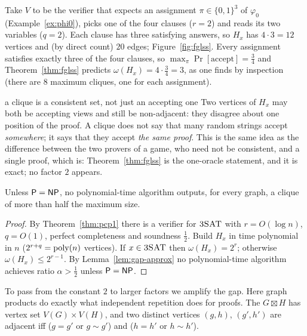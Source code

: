\begin{example}\label{ex:fglss}
Take $V$ to be the verifier that expects an assignment $\pi\in\{0,1\}^3$ of $\varphi_0$ (Example~\ref{ex:phi0}), picks one of the four clauses ($r=2$) and reads its two variables ($q=2$).
Each clause has three satisfying answers, so $H_x$ has $4\cdot3=12$ vertices and (by direct count) $20$ edges; Figure~\ref{fig:fglss}.  Every assignment satisfies exactly three of
the four clauses, so $\max_\pi\Pr[\text{accept}]=\tfrac34$ and Theorem~\ref{thm:fglss} predicts $\omega(H_x)=4\cdot\tfrac34=3$, as one finds by inspection (there are $8$ maximum cliques, one for each
assignment).
\end{example}

\begin{pitfall}[unbreakable]{a clique is a consistent set, not just an accepting one}
Two vertices of $H_x$ may both be accepting views and still be non-adjacent: they disagree about one position of the proof.  A clique does not say that many random strings accept
\emph{somewhere}; it says that they accept \emph{the same proof}.  This is the same idea as the difference between the two provers of a game, who need not be consistent, and a single proof, which is:
Theorem~\ref{thm:fglss} is the one-oracle statement, and it is exact; no factor $2$ appears.
\end{pitfall}

\begin{corollary}\label{cor:clique-const}
Unless $\mathsf{P}=\mathsf{NP}$, no polynomial-time algorithm outputs, for every graph, a clique of more than half the maximum size.
\end{corollary}
\begin{proof}
By Theorem~\ref{thm:pcp1} there is a verifier for $\textsc{3SAT}$ with $r=O(\log n)$, $q=O(1)$, perfect completeness and soundness $\tfrac12$.  Build $H_x$ in time polynomial in $n$ ($2^{r+q}=\operatorname{poly}(n)$ vertices).
If $x\in\textsc{3SAT}$ then $\omega(H_x)=2^r$; otherwise $\omega(H_x)\le2^{r-1}$.  By Lemma~\ref{lem:gap-approx} no polynomial-time algorithm achieves ratio $\alpha>\tfrac12$ unless $\mathsf{P}=\mathsf{NP}$.
\end{proof}

To pass from the constant $2$ to larger factors we amplify the gap.  Here graph products do exactly what independent repetition does for proofs.  The  $G\boxtimes H$ has vertex set $V(G)\times V(H)$, and
two distinct vertices $(g,h)$, $(g',h')$ are adjacent iff ($g=g'$ or $g\sim g'$) and ($h=h'$ or $h\sim h'$).


